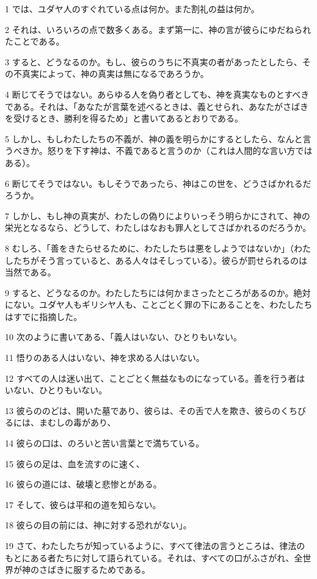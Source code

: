\par 1 では、ユダヤ人のすぐれている点は何か。また割礼の益は何か。
\par 2 それは、いろいろの点で数多くある。まず第一に、神の言が彼らにゆだねられたことである。
\par 3 すると、どうなるのか。もし、彼らのうちに不真実の者があったとしたら、その不真実によって、神の真実は無になるであろうか。
\par 4 断じてそうではない。あらゆる人を偽り者としても、神を真実なものとすべきである。それは、「あなたが言葉を述べるときは、義とせられ、あなたがさばきを受けるとき、勝利を得るため」と書いてあるとおりである。
\par 5 しかし、もしわたしたちの不義が、神の義を明らかにするとしたら、なんと言うべきか。怒りを下す神は、不義であると言うのか（これは人間的な言い方ではある）。
\par 6 断じてそうではない。もしそうであったら、神はこの世を、どうさばかれるだろうか。
\par 7 しかし、もし神の真実が、わたしの偽りによりいっそう明らかにされて、神の栄光となるなら、どうして、わたしはなおも罪人としてさばかれるのだろうか。
\par 8 むしろ、「善をきたらせるために、わたしたちは悪をしようではないか」（わたしたちがそう言っていると、ある人々はそしっている）。彼らが罰せられるのは当然である。
\par 9 すると、どうなるのか。わたしたちには何かまさったところがあるのか。絶対にない。ユダヤ人もギリシヤ人も、ことごとく罪の下にあることを、わたしたちはすでに指摘した。
\par 10 次のように書いてある、「義人はいない、ひとりもいない。
\par 11 悟りのある人はいない、神を求める人はいない。
\par 12 すべての人は迷い出て、ことごとく無益なものになっている。善を行う者はいない、ひとりもいない。
\par 13 彼らののどは、開いた墓であり、彼らは、その舌で人を欺き、彼らのくちびるには、まむしの毒があり、
\par 14 彼らの口は、のろいと苦い言葉とで満ちている。
\par 15 彼らの足は、血を流すのに速く、
\par 16 彼らの道には、破壊と悲惨とがある。
\par 17 そして、彼らは平和の道を知らない。
\par 18 彼らの目の前には、神に対する恐れがない」。
\par 19 さて、わたしたちが知っているように、すべて律法の言うところは、律法のもとにある者たちに対して語られている。それは、すべての口がふさがれ、全世界が神のさばきに服するためである。
